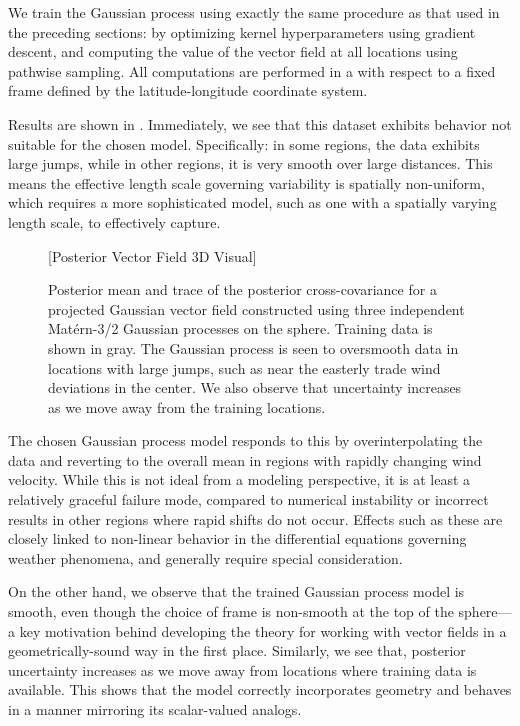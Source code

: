\documentclass[11pt]{book}
\begin{document}
We train the Gaussian process using exactly the same procedure as that used in the preceding sections: by optimizing kernel hyperparameters using gradient descent, and computing the value of the vector field at all locations using pathwise sampling.
All computations are performed in a with respect to a fixed frame defined by the latitude-longitude coordinate system.

Results are shown in .
Immediately, we see that this dataset exhibits behavior not suitable for the chosen model.
Specifically: in some regions, the data exhibits large jumps, while in other regions, it is very smooth over large distances.
This means the effective length scale governing variability is spatially non-uniform, which requires a more sophisticated model, such as one with a spatially varying length scale, to effectively capture.

\begin{figure}
\vspace*{10ex}
[Posterior Vector Field 3D Visual]
\vspace*{10ex}
\caption{Posterior mean and trace of the posterior cross-covariance for a projected Gaussian vector field constructed using three independent Matérn-3/2 Gaussian processes on the sphere. Training data is shown in gray. The Gaussian process is seen to oversmooth data in locations with large jumps, such as near the easterly trade wind deviations in the center. We also observe that uncertainty increases as we move away from the training locations.}
\label{fig:posterior-vector-field}
\end{figure}

The chosen Gaussian process model responds to this by overinterpolating the data and reverting to the overall mean in regions with rapidly changing wind velocity.
While this is not ideal from a modeling perspective, it is at least a relatively graceful failure mode, compared to numerical instability or incorrect results in other regions where rapid shifts do not occur.
Effects such as these are closely linked to non-linear behavior in the differential equations governing weather phenomena, and generally require special consideration.

On the other hand, we observe that the trained Gaussian process model is smooth, even though the choice of frame is non-smooth at the top of the sphere---a key motivation behind developing the theory for working with vector fields in a geometrically-sound way in the first place.
Similarly, we see that, posterior uncertainty increases as we move away from locations where training data is available.
This shows that the model correctly incorporates geometry and behaves in a manner mirroring its scalar-valued analogs.
\end{document}
